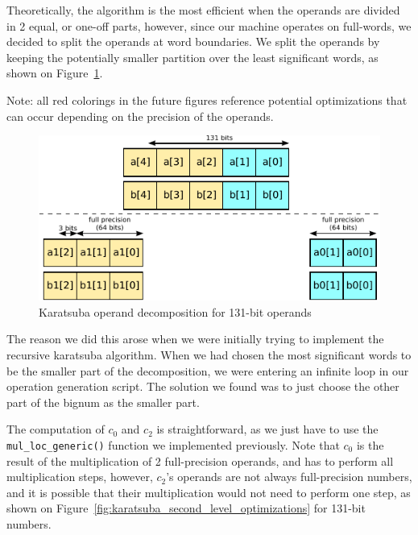\documentclass[12pt, a4paper]{report}
\begin{document}
Theoretically, the algorithm is the most efficient when the operands are divided in 2 equal, or one-off
parts, however, since our machine operates on full-words, we decided to split
the operands at word boundaries.
We split the operands by keeping the potentially smaller partition over the least significant words, as shown on
Figure~\ref{fig:karatsuba_operand_cut}.

Note: all red colorings in the future figures reference potential optimizations
that can occur depending on the precision of the operands.

\begin{figure}[h]
\centering
\includegraphics[scale=0.8]{figs/karatsuba_operand_cut}
\caption{Karatsuba operand decomposition for 131-bit operands}
\label{fig:karatsuba_operand_cut}
\end{figure}

The reason we did this arose when we
were initially trying to implement the recursive karatsuba algorithm.
When we had chosen the most significant words to be the smaller part of the
decomposition, we were entering an infinite loop in our operation generation
script.
The solution we found was to just choose the other part of the bignum as the
smaller part.

The computation of $c_0$ and $c_2$ is straightforward, as we just have to use
the \verb+mul_loc_generic()+ function we implemented previously.
Note that $c_0$ is the result of the multiplication of 2 full-precision
operands, and has to perform all multiplication steps, however, $c_2$'s operands
are not always full-precision numbers, and it is possible that their multiplication
would not need to perform one step, as shown on
Figure~\ref{fig:karatsuba_second_level_optimizations} for 131-bit numbers.
\end{document}
